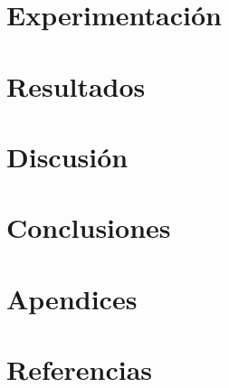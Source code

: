 \documentclass[10pt,a4paper]{article}
\begin{document}
\section{Experimentación}

\newpage

\section{Resultados}

\newpage


\section{Discusión}

\newpage

\section{Conclusiones}

\newpage

\section{Apendices}
	
\newpage

\section{Referencias}
	
\newpage
\end{document}
